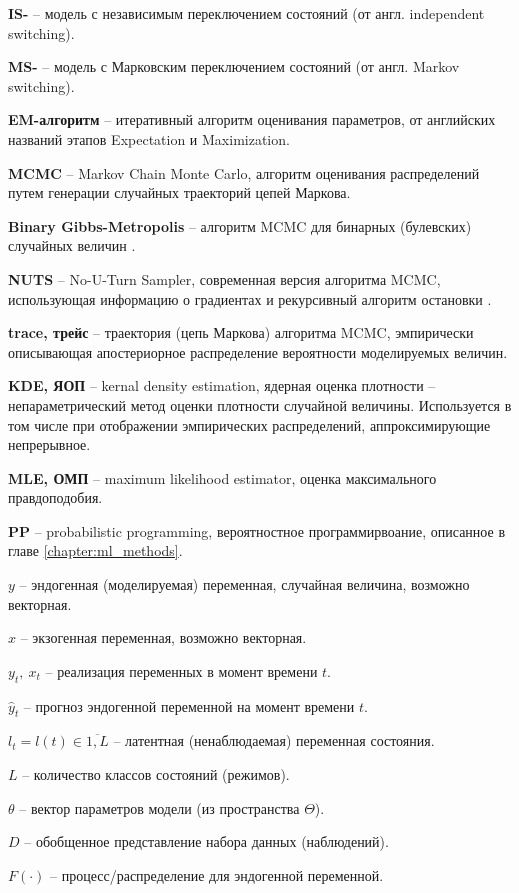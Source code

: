 \documentclass[a4paper,14pt]{extreport}
\begin{document}
\textbf{IS-} -- модель с независимым переключением состояний (от англ. independent switching).

\textbf{MS-} -- модель с Марковским переключением состояний (от англ. Markov switching).

\textbf{EM-алгоритм} -- итеративный алгоритм оценивания параметров, от английских названий этапов Expectation и Maximization.

\textbf{MCMC} -- Markov Chain Monte Carlo, алгоритм оценивания распределений путем генерации случайных траекторий цепей Маркова.

\textbf{Binary Gibbs-Metropolis} -- алгоритм MCMC для бинарных (булевских) случайных величин \cite{pymc3_2016}.

\textbf{NUTS} -- No-U-Turn Sampler, современная версия алгоритма MCMC, использующая информацию о градиентах и рекурсивный алгоритм остановки \cite{nuts_hoffman_gelman}.

\textbf{trace, трейс} -- траектория (цепь Маркова) алгоритма MCMC, эмпирически описывающая апостериорное распределение вероятности моделируемых величин.

\textbf{KDE, ЯОП} -- kernal density estimation, ядерная оценка плотности -- непараметрический метод оценки плотности случайной величины. Используется в том числе при отображении эмпирических распределений, аппроксимирующие непрерывное.

\textbf{MLE, ОМП} -- maximum likelihood estimator, оценка максимального правдоподобия.

\textbf{PP} -- probabilistic programming, вероятностное программирвоание, описанное в главе \ref{chapter:ml_methods}.

$y$ -- эндогенная (моделируемая) переменная, случайная величина, возможно векторная.

$x$ -- экзогенная переменная, возможно векторная.

$y_t, \: x_t$ -- реализация переменных в момент времени $t$.

$\hat{y}_t$ -- прогноз эндогенной переменной на момент времени $t$.

$l_t = l(t) \in \overline{1,L}$ -- латентная (ненаблюдаемая) переменная состояния.

$L$ -- количество классов состояний (режимов).

$\theta$ -- вектор параметров модели (из пространства $\Theta$).

$D$ -- обобщенное представление набора данных (наблюдений).

$F(\cdot)$ -- процесс/распределение для эндогенной переменной.
\end{document}
